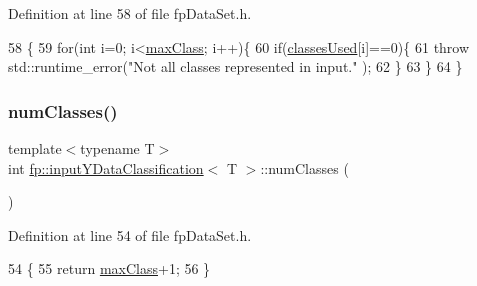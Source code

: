 Definition at line 58 of file fp\+Data\+Set.\+h.


\begin{DoxyCode}
58                                        \{
59             \textcolor{keywordflow}{for}(\textcolor{keywordtype}{int} i=0; i<\hyperlink{classfp_1_1inputYDataClassification_a5edb210f521aebaaf8d73b5c9ef68cf1}{maxClass}; i++)\{
60                 \textcolor{keywordflow}{if}(\hyperlink{classfp_1_1inputYDataClassification_ad204a3c72d6b85884552f262ba9cf7fc}{classesUsed}[i]==0)\{
61                     \textcolor{keywordflow}{throw} std::runtime\_error(\textcolor{stringliteral}{"Not all classes represented in input."} );
62                 \}
63             \}
64         \}
\end{DoxyCode}
\mbox{\label{classfp_1_1inputYDataClassification_ade4b45e3da55233214135b6de8976297}} 
\subsubsection{\texorpdfstring{num\+Classes()}{numClasses()}}
{\footnotesize\ttfamily template$<$typename T$>$ \\
int \hyperlink{classfp_1_1inputYDataClassification}{fp\+::input\+Y\+Data\+Classification}$<$ T $>$\+::num\+Classes (\begin{DoxyParamCaption}{ }\end{DoxyParamCaption})\hspace{0.3cm}{\ttfamily [inline]}}



Definition at line 54 of file fp\+Data\+Set.\+h.


\begin{DoxyCode}
54                                \{
55             \textcolor{keywordflow}{return} \hyperlink{classfp_1_1inputYDataClassification_a5edb210f521aebaaf8d73b5c9ef68cf1}{maxClass}+1;
56         \}
\end{DoxyCode}
\mbox{\label{classfp_1_1inputYDataClassification_a421b4107615668eebf7bf447fb99ecc5}} 
